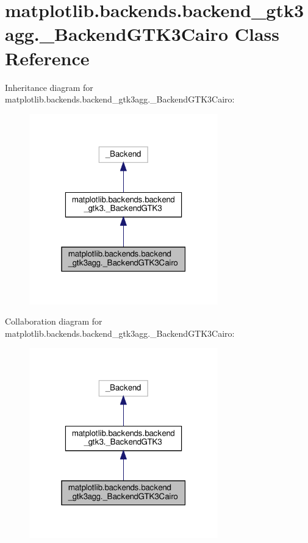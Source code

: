 \hypertarget{classmatplotlib_1_1backends_1_1backend__gtk3agg_1_1__BackendGTK3Cairo}{}\section{matplotlib.\+backends.\+backend\+\_\+gtk3agg.\+\_\+\+Backend\+G\+T\+K3\+Cairo Class Reference}
\label{classmatplotlib_1_1backends_1_1backend__gtk3agg_1_1__BackendGTK3Cairo}


Inheritance diagram for matplotlib.\+backends.\+backend\+\_\+gtk3agg.\+\_\+\+Backend\+G\+T\+K3\+Cairo\+:
\nopagebreak
\begin{figure}[H]
\begin{center}
\leavevmode
\includegraphics[width=232pt]{classmatplotlib_1_1backends_1_1backend__gtk3agg_1_1__BackendGTK3Cairo__inherit__graph}
\end{center}
\end{figure}


Collaboration diagram for matplotlib.\+backends.\+backend\+\_\+gtk3agg.\+\_\+\+Backend\+G\+T\+K3\+Cairo\+:
\nopagebreak
\begin{figure}[H]
\begin{center}
\leavevmode
\includegraphics[width=232pt]{classmatplotlib_1_1backends_1_1backend__gtk3agg_1_1__BackendGTK3Cairo__coll__graph}
\end{center}
\end{figure}
